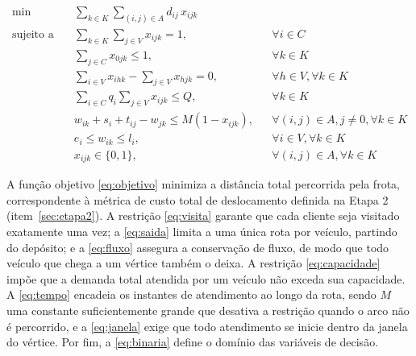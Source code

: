 \begin{align}
	\min \quad & \sum_{k \in K} \sum_{(i,j) \in A} d_{ij} \, x_{ijk}
	\label{eq:objetivo} \\
	\text{sujeito a} \quad
	& \sum_{k \in K} \sum_{j \in V} x_{ijk} = 1,
	&& \forall i \in C \label{eq:visita} \\
	& \sum_{j \in C} x_{0jk} \leq 1,
	&& \forall k \in K \label{eq:saida} \\
	& \sum_{i \in V} x_{ihk} - \sum_{j \in V} x_{hjk} = 0,
	&& \forall h \in V, \forall k \in K \label{eq:fluxo} \\
	& \sum_{i \in C} q_i \sum_{j \in V} x_{ijk} \leq Q,
	&& \forall k \in K \label{eq:capacidade} \\
	& w_{ik} + s_i + t_{ij} - w_{jk} \leq M (1 - x_{ijk}),
	&& \forall (i, j) \in A, j \neq 0, \forall k \in K \label{eq:tempo} \\
	& e_i \leq w_{ik} \leq l_i,
	&& \forall i \in V, \forall k \in K \label{eq:janela} \\
	& x_{ijk} \in \{0, 1\},
	&& \forall (i, j) \in A, \forall k \in K \label{eq:binaria}
\end{align}

A função objetivo \eqref{eq:objetivo} minimiza a distância total percorrida pela frota,
correspondente à métrica de custo total de deslocamento definida na Etapa 2
(item~\ref{sec:etapa2}). A restrição \eqref{eq:visita} garante que cada cliente seja
visitado exatamente uma vez; a \eqref{eq:saida} limita a uma única rota por veículo,
partindo do depósito; e a \eqref{eq:fluxo} assegura a conservação de fluxo, de modo que
todo veículo que chega a um vértice também o deixa. A restrição \eqref{eq:capacidade}
impõe que a demanda total atendida por um veículo não exceda sua capacidade. A
\eqref{eq:tempo} encadeia os instantes de atendimento ao longo da rota, sendo $M$ uma
constante suficientemente grande que desativa a restrição quando o arco não é
percorrido, e a \eqref{eq:janela} exige que todo atendimento se inicie dentro da janela
do vértice. Por fim, a \eqref{eq:binaria} define o domínio das variáveis de decisão.


